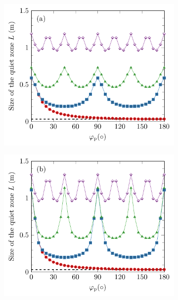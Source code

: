 \begin{figure}[!htb]
    \centering
    \begin{subfigure}{0.49\textwidth}
        \centering
        \includegraphics[width = \textwidth]{fig/200325K_size_PAL_v3.pdf}
    \end{subfigure}
    \begin{subfigure}{0.49\textwidth}
        \centering
        \includegraphics[width = \textwidth]{fig/200325K_size_Monopole_v3.pdf}
    \end{subfigure}
    \\

\end{figure}
